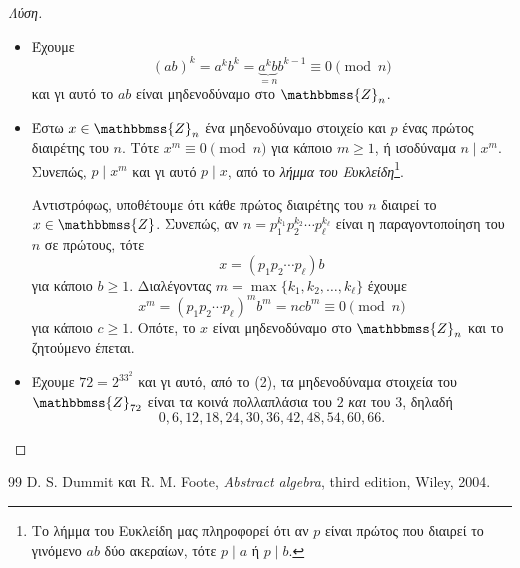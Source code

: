 \documentclass[12pt,a4paper,reqno]{amsart}
\theoremstyle{definition}
\newcommand{\ZZ}{\mathbbmss{Z}}
\begin{document}
\begin{proof}[Λύση]
  \leavevmode
  \begin{itemize}
    \item[(1)] Έχουμε 
    \[
    (ab)^k = a^kb^k = \underbrace{a^kb}_{=n}b^{k-1} \equiv 0 \pmod{n}
    \]
    και γι αυτό το $ab$ είναι μηδενοδύναμο στο $\ZZ_n$.
    \item[(2)] Έστω $x \in \ZZ_n$ ένα μηδενοδύναμο στοιχείο και $p$ ένας πρώτος διαιρέτης του $n$. Τότε $x^m \equiv 0 \pmod{n}$ για κάποιο $m \ge 1$, ή ισοδύναμα $n \mid x^m$. Συνεπώς, $p \mid x^m$ και γι αυτό $p \mid x$, από το \emph{λήμμα του Ευκλείδη}\footnote{Το λήμμα του Ευκλείδη μας πληροφορεί ότι αν $p$ είναι πρώτος που διαιρεί το γινόμενο $ab$ δύο ακεραίων, τότε $p \mid a$ ή $p \mid b$.}.
    
    Αντιστρόφως, υποθέτουμε ότι κάθε πρώτος διαιρέτης του $n$ διαιρεί το $x \in \ZZ$. Συνεπώς, αν $n = p_1^{k_1}p_2^{k_2}\cdots p_\ell^{k_\ell}$ είναι η παραγοντοποίηση του $n$ σε πρώτους, τότε 
    \[
    x = (p_1p_2\cdots p_\ell)b
    \]
    για κάποιο $b \ge 1$. Διαλέγοντας $m = \max\{k_1, k_2, \dots, k_\ell\}$ έχουμε 
    \[
    x^m = (p_1p_2\cdots p_\ell)^mb^m = n cb^m \equiv 0 \pmod{n}
    \]
    για κάποιο $c \ge 1$. Οπότε, το $x$ είναι μηδενοδύναμο στο $\ZZ_n$ και το ζητούμενο έπεται.
    \item[(3)] Έχουμε $72 = 2^33^2$ και γι αυτό, από το (2), τα μηδενοδύναμα στοιχεία του $\ZZ_{72}$ είναι τα κοινά πολλαπλάσια του $2$ \emph{και} του $3$, δηλαδή
    \[
    0, 6,12,18,24,30,36,42,48,54,60,66.
    \]
  \end{itemize}
\end{proof}

\begin{thebibliography}{99}
    D. S. Dummit και R. M. Foote, 
    \textit{Abstract algebra},
    third edition, Wiley, 2004. 
\end{thebibliography}
\end{document}
